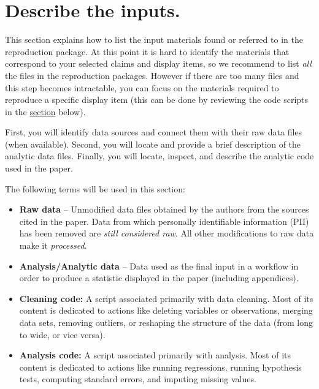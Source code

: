 \documentclass[]{book}
\providecommand{\tightlist}{%
  \setlength{\itemsep}{0pt}\setlength{\parskip}{0pt}}
\begin{document}
\hypertarget{describe-inputs}{%
\section{Describe the inputs.}\label{describe-inputs}}

This section explains how to list the input materials found or referred to in the reproduction package. At this point it is hard to identify the materials that correspond to your selected claims and display items, so we recommend to list \emph{all} the files in the reproduction packages. However if there are too many files and this step becomes intractable, you can focus on the materials required to reproduce a specific display item (this can be done by reviewing the code scripts in the \protect\hyperlink{desc-analy}{section} below).

First, you will identify data sources and connect them with their raw data files (when available). Second, you will locate and provide a brief description of the analytic data files. Finally, you will locate, inspect, and describe the analytic code used in the paper.

The following terms will be used in this section:

\begin{itemize}
\tightlist
\item
  \textbf{Raw data} -- Unmodified data files obtained by the authors from the sources cited in the paper. Data from which personally identifiable information (PII) has been removed are \emph{still considered raw}. All other modifications to raw data make it \emph{processed}.\\
\item
  \textbf{Analysis/Analytic data} -- Data used as the final input in a workflow in order to produce a statistic displayed in the paper (including appendices).\\
\item
  \textbf{Cleaning code:} A script associated primarily with data cleaning. Most of its content is dedicated to actions like deleting variables or observations, merging data sets, removing outliers, or reshaping the structure of the data (from long to wide, or vice versa).\\
\item
  \textbf{Analysis code:} A script associated primarily with analysis. Most of its content is dedicated to actions like running regressions, running hypothesis tests, computing standard errors, and imputing missing values.
\end{itemize}
\end{document}
